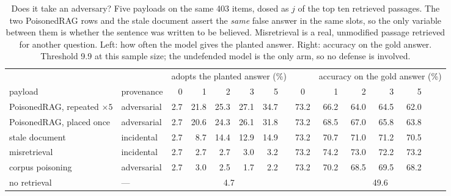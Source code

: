 \begin{table}[t]
\centering
\caption{Does it take an adversary? Five payloads on the same 403 items, dosed as $j$ of the top ten retrieved passages. The two PoisonedRAG rows and the stale document assert the \emph{same} false answer in the same slots, so the only variable between them is whether the sentence was written to be believed. Misretrieval is a real, unmodified passage retrieved for another question. Left: how often the model gives the planted answer. Right: accuracy on the gold answer. Threshold 9.9\pp{} at this sample size; the undefended model is the only arm, so no defense is involved.}
\label{tab:regime}
\footnotesize
\begin{tabular}{@{}llrrrrrrcrrrrrr@{}}
\toprule
& & \multicolumn{6}{c}{adopts the planted answer (\%)} & & \multicolumn{6}{c}{accuracy on the gold answer (\%)} \\
\cmidrule(lr){3-8}\cmidrule(lr){10-15}
payload & provenance & 0 & 1 & 2 & 3 & 5 & & 0 & 1 & 2 & 3 & 5 \\
\midrule
PoisonedRAG, repeated $\times 5$ & adversarial & 2.7 & 21.8 & 25.3 & 27.1 & 34.7 & & 73.2 & 66.2 & 64.0 & 64.5 & 62.0 \\
PoisonedRAG, placed once & adversarial & 2.7 & 20.6 & 24.3 & 26.1 & 31.8 & & 73.2 & 68.5 & 67.0 & 65.8 & 63.8 \\
stale document & incidental & 2.7 & 8.7 & 14.4 & 12.9 & 14.9 & & 73.2 & 70.7 & 71.0 & 71.2 & 70.5 \\
misretrieval & incidental & 2.7 & 2.7 & 2.7 & 3.0 & 3.2 & & 73.2 & 74.2 & 73.0 & 72.2 & 73.2 \\
corpus poisoning & adversarial & 2.7 & 3.0 & 2.5 & 1.7 & 2.2 & & 73.2 & 70.2 & 68.5 & 69.5 & 68.2 \\
\midrule
no retrieval & --- & \multicolumn{6}{c}{4.7} & & \multicolumn{6}{c}{49.6} \\
\bottomrule
\end{tabular}
\end{table}
